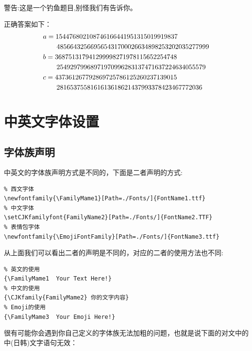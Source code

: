 \documentclass[12pt]{article}
\begin{document}
\begin{warning}
    警告:这是一个钓鱼题目,别怪我们有告诉你。

    正确答案如下：
    \begin{align*}
        & a=154476802108746166441951315019919837\\
            &\hspace*{2em} 485664325669565431700026634898253202035277999\\
        & b=368751317941299998271978115652254748\\
            &\hspace*{2em} 25492979968971970996283137471637224634055579\\
        & c=437361267792869725786125260237139015\\
            &\hspace*{2em} 2816537558161613618621437993378423467772036
    \end{align*}
\end{warning}
                                                                                                                                                                                                                                                                                                         

\clearpage
\section{中英文字体设置}
\subsection{字体族声明}
中英文的字体族声明方式是不同的，下面是二者声明的方式:
\begin{lstlisting}
% 西文字体
\newfontfamily{\FamilyMame1}[Path=./Fonts/]{FontName1.ttf}
% 中文字体
\setCJKfamilyfont{FamilyName2}[Path=./Fonts/]{FontName2.TTF}
% 表情包字体
\newfontfamily{\EmojiFontFamily}[Path=./Fonts/]{FontName3.ttf}
\end{lstlisting}

从上面我们可以看出二者的声明是不同的，对应的二者的使用方法也不同:
\begin{lstlisting}
% 英文的使用
{\FamilyMame1  Your Text Here!}
% 中文的使用
{\CJKfamily{FamilyMame2} 你的文字内容}
% Emoji的使用
{\FamilyMame3  Your Emoji Here!}
\end{lstlisting}

很有可能你会遇到你自己定义的字体族无法加粗的问题，也就是说下面的对文中的中(日韩)文字语句无效：
\end{document}
